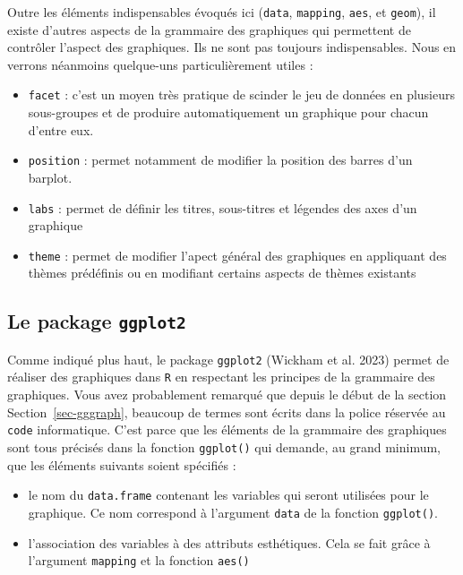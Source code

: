 \documentclass[
  a4paper,
  DIV=11,
  numbers=noendperiod,
  oneside]{scrreprt}
\providecommand{\tightlist}{%
  \setlength{\itemsep}{0pt}\setlength{\parskip}{0pt}}\usepackage{longtable,booktabs,array}
\begin{document}
Outre les éléments indispensables évoqués ici (\texttt{data},
\texttt{mapping}, \texttt{aes}, et \texttt{geom}), il existe d'autres
aspects de la grammaire des graphiques qui permettent de contrôler
l'aspect des graphiques. Ils ne sont pas toujours indispensables. Nous
en verrons néanmoins quelque-uns particulièrement utiles :

\begin{itemize}
\tightlist
\item
  \texttt{facet} : c'est un moyen très pratique de scinder le jeu de
  données en plusieurs sous-groupes et de produire automatiquement un
  graphique pour chacun d'entre eux.
\item
  \texttt{position} : permet notamment de modifier la position des
  barres d'un barplot.
\item
  \texttt{labs} : permet de définir les titres, sous-titres et légendes
  des axes d'un graphique
\item
  \texttt{theme} : permet de modifier l'apect général des graphiques en
  appliquant des thèmes prédéfinis ou en modifiant certains aspects de
  thèmes existants
\end{itemize}

\subsection{\texorpdfstring{Le package
\texttt{ggplot2}}{Le package ggplot2}}\label{le-package-ggplot2}

Comme indiqué plus haut, le package \texttt{ggplot2} (Wickham et al.
2023) permet de réaliser des graphiques dans \texttt{R} en respectant
les principes de la grammaire des graphiques. Vous avez probablement
remarqué que depuis le début de la section Section~\ref{sec-gggraph},
beaucoup de termes sont écrits dans la police réservée au \texttt{code}
informatique. C'est parce que les éléments de la grammaire des
graphiques sont tous précisés dans la fonction \texttt{ggplot()} qui
demande, au grand minimum, que les éléments suivants soient spécifiés :

\begin{itemize}
\tightlist
\item
  le nom du \texttt{data.frame} contenant les variables qui seront
  utilisées pour le graphique. Ce nom correspond à l'argument
  \texttt{data} de la fonction \texttt{ggplot()}.
\item
  l'association des variables à des attributs esthétiques. Cela se fait
  grâce à l'argument \texttt{mapping} et la fonction \texttt{aes()}
\end{itemize}
\end{document}
